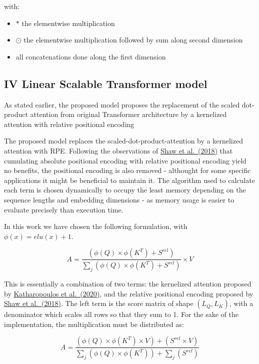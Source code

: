 with:

\begin{itemize}
\tightlist
\item
  \(*\) the elementwise multiplication
\item
  \(\odot\) the elementwise multiplication followed by sum along second
  dimension
\item
  all concatenations done along the first dimension
\end{itemize}

\hypertarget{iv-linear-scalable-transformer-model}{%
\subsection{IV Linear Scalable Transformer
model}\label{iv-linear-scalable-transformer-model}}

As stated earlier, the proposed model proposes the replacement of the
scaled dot-product attention from original Transformer architecture by a
kernelized attention with relative positional encoding

The proposed model replaces the scaled-dot-product-attention by a
kernelized attention with RPE. Following the observations of
\href{https://arxiv.org/abs/1803.02155}{Shaw et al.~(2018)} that
cumulating absolute positional encoding with relative positional
encoding yield no benefits, the positional encoding is also removed -
althought for some specific applications it might be beneficial to
maintain it. The algorithm used to calculate each term is chosen
dynamically to occupy the least memory depending on the sequence lengths
and embedding dimensions - as memory usage is easier to evaluate
precisely than execution time.

In this work we have chosen the following formulation, with
\(\phi(x) = elu(x) + 1\).

\[A = \frac{\left( \phi(Q) \times \phi(K^T) + S^{rel} \right)}{\sum_j \left( \phi(Q) \times \phi(K^T) + S^{rel} \right)} \times V\]

This is essentially a combination of two terms: the kernelized attention
proposed by \href{https://arxiv.org/abs/2006.16236}{Katharopoulos et
al.~(2020)}, and the relative positional encoding proposed by
\href{https://arxiv.org/abs/1803.02155}{Shaw et al.~(2018)}. The left
term is the score matrix of shape \((L_Q, L_K)\), with a denominator
which scales all rows so that they sum to 1. For the sake of the
implementation, the multiplication must be distributed as:

\[A = \frac{\left( \phi(Q) \times \phi(K^T) \times V \right) + \left( S^{rel} \times V\right)}{\sum_j \left( \phi(Q) \times \phi(K^T) \right) + \sum_j \left( S^{rel} \right)}\]

